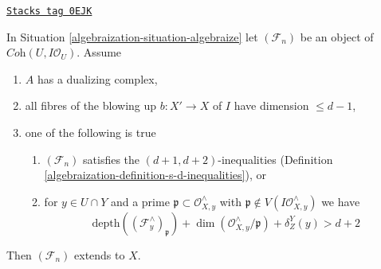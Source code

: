 \begin{lemma}[Blowup]
\label{algebraization-lemma-blowup}
\href{https://stacks.math.columbia.edu/tag/0EJK}{\texttt{Stacks tag 0EJK}}

In Situation \ref{algebraization-situation-algebraize} let $(\mathcal{F}_n)$
be an object of $\textit{Coh}(U, I\mathcal{O}_U)$. Assume
\begin{enumerate}
\item $A$ has a dualizing complex,
\item all fibres of the blowing up $b : X' \to X$ of $I$
have dimension $\leq d - 1$,
\item one of the following is true
\begin{enumerate}
\item $(\mathcal{F}_n)$ satisfies the $(d + 1, d + 2)$-inequalities
(Definition \ref{algebraization-definition-s-d-inequalities}), or
\item for $y \in U \cap Y$ and a prime
$\mathfrak p \subset \mathcal{O}_{X, y}^\wedge$ with
$\mathfrak p \not \in V(I\mathcal{O}_{X, y}^\wedge)$
we have
$$
\text{depth}((\mathcal{F}^\wedge_y)_\mathfrak p) +
\dim(\mathcal{O}_{X, y}^\wedge/\mathfrak p) + \delta^Y_Z(y) > d + 2
$$
\end{enumerate}
\end{enumerate}
Then $(\mathcal{F}_n)$ extends to $X$.
\end{lemma}

